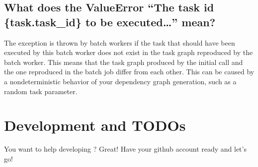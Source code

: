 \documentclass[letterpaper,10pt,english]{sphinxmanual}
\begin{document}
\subsection{What does the ValueError “The task id \{task.task\_id\} to be executed…” mean?}
\label{\detokenize{advanced/faq:what-does-the-valueerror-the-task-id-task-task-id-to-be-executed-mean}}
The  exception  is thrown by  batch workers if
the task that should have been executed by this batch worker does not exist in the task
graph reproduced by the batch worker. This means that the task graph produced by the initial
 call and the one reproduced in the batch job differ from each other.
This can be caused by a non\sphinxhyphen{}deterministic behavior of your dependency graph generation, such
as a random task parameter.


\section{Development and TODOs}
\label{\detokenize{advanced/development:development-and-todos}}\label{\detokenize{advanced/development:development-label}}\label{\detokenize{advanced/development::doc}}
You want to help developing ? Great! Have your github account ready and let’s go!
\end{document}
